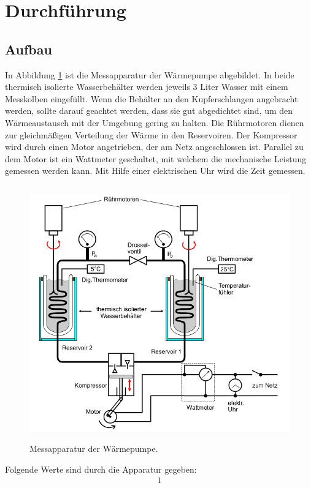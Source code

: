  \section{Durchführung}
\label{sec:Durchführung}

\subsection{Aufbau}

In Abbildung \ref{fig:WaermepumpeAufbau} ist die Messapparatur der
Wärmepumpe abgebildet. In beide thermisch isolierte Wasserbehälter werden
jeweils 3 Liter Wasser mit einem Messkolben eingefüllt. Wenn die Behälter an den
Kupferschlangen angebracht
werden, sollte darauf geachtet werden, dass sie gut abgedichtet sind, um den
Wärmeaustausch mit der Umgebung gering zu halten. Die Rührmotoren dienen zur
gleichmäßigen Verteilung der Wärme in den Reservoiren.
Der Kompressor wird durch einen Motor angetrieben, der am Netz angeschlossen
ist. Parallel zu dem Motor ist ein Wattmeter geschaltet, mit welchem die
mechanische Leistung gemessen werden kann. Mit Hilfe einer elektrischen Uhr
wird die Zeit gemessen.

\newpage

\begin{figure}
  \centering
  \includegraphics[height=11cm]{WaermepumpeAufbau.png}
  \caption{Messapparatur der Wärmepumpe.}
  \label{fig:WaermepumpeAufbau}
\end{figure}

Folgende Werte sind durch die Apparatur gegeben:
\begin{align}
  1
\end{align}

